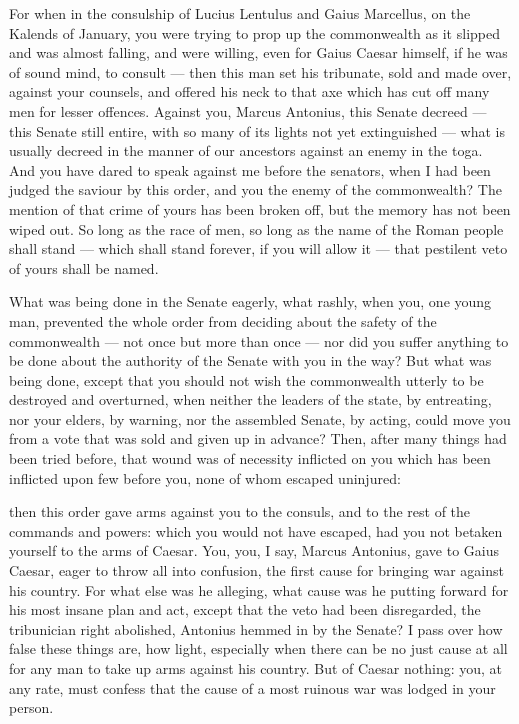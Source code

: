  For when in the consulship of Lucius Lentulus and Gaius Marcellus, on the Kalends of January, you were trying to prop up the commonwealth as it slipped and was almost falling, and were willing, even for Gaius Caesar himself, if he was of sound mind, to consult --- then this man set his tribunate, sold and made over, against your counsels, and offered his neck to that axe which has cut off many men for lesser offences. Against you, Marcus Antonius, this Senate decreed --- this Senate still entire, with so many of its lights not yet extinguished --- what is usually decreed in the manner of our ancestors against an enemy in the toga. And you have dared to speak against me before the senators, when I had been judged the saviour by this order, and you the enemy of the commonwealth? The mention of that crime of yours has been broken off, but the memory has not been wiped out. So long as the race of men, so long as the name of the Roman people shall stand --- which shall stand forever, if you will allow it --- that pestilent veto of yours shall be named.

 What was being done in the Senate eagerly, what rashly, when you, one young man, prevented the whole order from deciding about the safety of the commonwealth --- not once but more than once --- nor did you suffer anything to be done about the authority of the Senate with you in the way? But what was being done, except that you should not wish the commonwealth utterly to be destroyed and overturned, when neither the leaders of the state, by entreating, nor your elders, by warning, nor the assembled Senate, by acting, could move you from a vote that was sold and given up in advance? Then, after many things had been tried before, that wound was of necessity inflicted on you which has been inflicted upon few before you, none of whom escaped uninjured:

 then this order gave arms against you to the consuls, and to the rest of the commands and powers: which you would not have escaped, had you not betaken yourself to the arms of Caesar. You, you, I say, Marcus Antonius, gave to Gaius Caesar, eager to throw all into confusion, the first cause for bringing war against his country. For what else was he alleging, what cause was he putting forward for his most insane plan and act, except that the veto had been disregarded, the tribunician right abolished, Antonius hemmed in by the Senate? I pass over how false these things are, how light, especially when there can be no just cause at all for any man to take up arms against his country. But of Caesar nothing: you, at any rate, must confess that the cause of a most ruinous war was lodged in your person.

